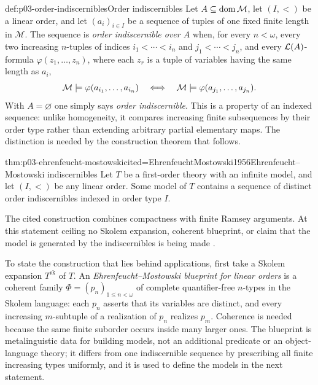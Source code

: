 \begin{hbdefinition}{def:p03-order-indiscernibles}{Order indiscernibles}
Let \(A\subseteq\operatorname{dom}\mathcal M\), let \((I,<)\) be a linear order, and let
\((a_i)_{i\in I}\) be a sequence of tuples of one fixed finite length in
\(\mathcal M\).  The sequence is \emph{order indiscernible over \(A\)} when,
for every \(n<\omega\), every two increasing \(n\)-tuples of indices
\(i_1<\cdots<i_n\) and \(j_1<\cdots<j_n\), and every
\(\mathcal{L}(A)\)-formula \(\varphi(z_1,\ldots,z_n)\), where each \(z_r\) is a
tuple of variables having the same length as \(a_i\),
\[
 \mathcal M\models\varphi(a_{i_1},\ldots,a_{i_n})
 \quad\Longleftrightarrow\quad
 \mathcal M\models\varphi(a_{j_1},\ldots,a_{j_n}).
\]
With \(A=\varnothing\) one simply says \emph{order indiscernible}.  This is a
property of an indexed sequence: unlike homogeneity, it compares increasing
finite subsequences by their order type rather than extending arbitrary
partial elementary maps.  The distinction is needed by the construction
theorem that follows.
\end{hbdefinition}

\begin{hbtheorem}{thm:p03-ehrenfeucht-mostowski}{cited=EhrenfeuchtMostowski1956}{Ehrenfeucht--Mostowski indiscernibles}
Let \(T\) be a first-order theory with an infinite model, and let \((I,<)\)
be any linear order.  Some model of \(T\) contains a sequence of distinct
order indiscernibles indexed in order type \(I\).
\end{hbtheorem}

The cited construction combines compactness with finite Ramsey arguments.  At
this statement ceiling no Skolem expansion, coherent
blueprint, or claim that the model is generated by the indiscernibles is
being made \cite{EhrenfeuchtMostowski1956,Marker2002}.

To state the construction that lies behind applications, first take a
Skolem expansion \(T^{\mathrm{sk}}\) of \(T\).  An
\emph{Ehrenfeucht--Mostowski blueprint for linear orders} is a coherent
family \(\Phi=(p_n)_{1\leq n<\omega}\) of complete quantifier-free
\(n\)-types in the Skolem language: each \(p_n\) asserts that its variables
are distinct, and every increasing \(m\)-subtuple of a realization of
\(p_n\) realizes \(p_m\).  Coherence is needed because the same finite
suborder occurs inside many larger ones.  The blueprint is metalinguistic
data for building models, not an additional predicate or an object-language
theory; it differs from one indiscernible sequence by prescribing all finite
increasing types uniformly, and it is used to define the models in the next
statement.

